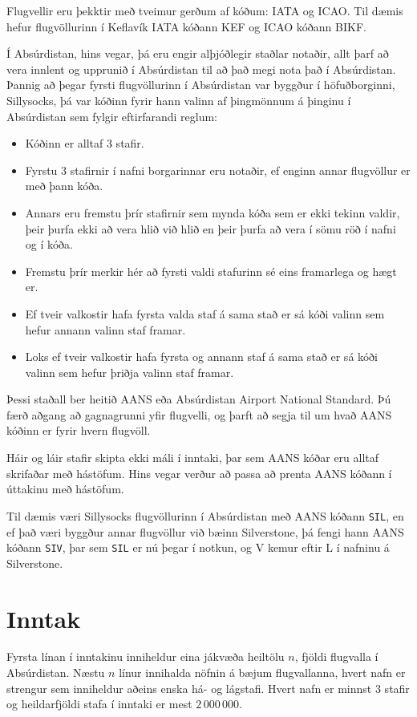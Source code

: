
Flugvellir eru þekktir með tveimur gerðum af kóðum: IATA og ICAO.
Til dæmis hefur flugvöllurinn í Keflavík IATA kóðann KEF og ICAO kóðann BIKF.

Í Absúrdistan, hins vegar, þá eru engir alþjóðlegir staðlar notaðir, allt þarf að vera innlent og upprunið í Absúrdistan til að það megi nota það í Absúrdistan.
Þannig að þegar fyrsti flugvöllurinn í Absúrdistan var byggður í höfuðborginni, Sillysocks, þá var kóðinn fyrir hann valinn af þingmönnum á þinginu í Absúrdistan sem fylgir eftirfarandi reglum:

\begin{itemize}
    \item Kóðinn er alltaf 3 stafir.
    \item Fyrstu 3 stafirnir í nafni borgarinnar eru notaðir, ef enginn annar flugvöllur er með þann kóða.
    \item Annars eru fremstu þrír stafirnir sem mynda kóða sem er ekki tekinn valdir, þeir þurfa ekki að vera hlið við hlið en þeir þurfa að vera í sömu röð í nafni og í kóða.
    \item Fremstu þrír merkir hér að fyrsti valdi stafurinn sé eins framarlega og hægt er. 
    \item Ef tveir valkostir hafa fyrsta valda staf á sama stað er sá kóði valinn sem hefur annann valinn staf framar.
    \item Loks ef tveir valkostir hafa fyrsta og annann staf á sama stað er sá kóði valinn sem hefur þriðja valinn staf framar.
\end{itemize}

Þessi staðall ber heitið AANS eða Absúrdistan Airport National Standard.
Þú færð aðgang að gagnagrunni yfir flugvelli, og þarft að segja til um hvað AANS kóðinn er fyrir hvern flugvöll.

Háir og láir stafir skipta ekki máli í inntaki, þar sem AANS kóðar eru alltaf skrifaðar með hástöfum.
Hins vegar verður að passa að prenta AANS kóðann í úttakinu með hástöfum.

Til dæmis væri Sillysocks flugvöllurinn í Absúrdistan með AANS kóðann \texttt{SIL}, en ef það væri byggður annar flugvöllur við bæinn Silverstone, þá fengi hann AANS kóðann \texttt{SIV}, þar sem \texttt{SIL} er nú þegar í notkun, og V kemur eftir L í nafninu á Silverstone.

\section*{Inntak}
Fyrsta línan í inntakinu inniheldur eina jákvæða heiltölu $n$, fjöldi flugvalla í Absúrdistan.
Næstu $n$ línur innihalda nöfnin á bæjum flugvallanna, hvert nafn er strengur sem inniheldur aðeins enska há- og lágstafi.
Hvert nafn er minnst $3$ stafir og heildarfjöldi stafa í inntaki er mest $2 \, 000 \, 000$.

